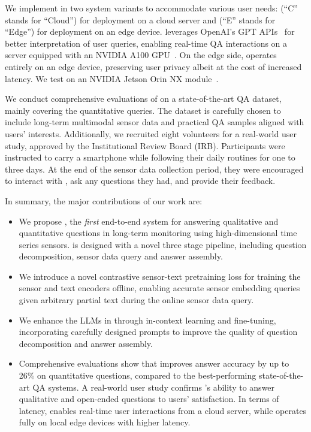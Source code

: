 We implement \Method in two system variants to accommodate various user needs: \MethodC (``C'' stands for ``Cloud'') for deployment on a cloud server and \MethodE (``E'' stands for ``Edge'') for deployment on an edge device. \MethodC leverages OpenAI’s GPT APIs~\cite{gpt-3.5,gpt-4} for better interpretation of user queries, enabling real-time QA interactions on a server equipped with an NVIDIA A100 GPU~\cite{a100}. On the edge side, \MethodE operates entirely on an edge device, preserving user privacy albeit at the cost of increased latency. We test \MethodE on an NVIDIA Jetson Orin NX module~\cite{jetsonorin}.

We conduct comprehensive evaluations of \Method on a state-of-the-art QA dataset, mainly covering the quantitative queries. The dataset is carefully chosen to include long-term multimodal sensor data and practical QA samples aligned with users' interests.
Additionally, we recruited eight volunteers for a real-world user study, approved by the Institutional Review Board (IRB). Participants were instructed to carry a smartphone while following their daily routines for one to three days. At the end of the sensor data collection period, they were encouraged to interact with \Method, ask any questions they had, and provide their feedback. %


In summary, the major contributions of our work are:
\begin{itemize}[nolistsep]
    \item We propose \Method, the \textit{first} end-to-end system for answering qualitative and quantitative questions in long-term monitoring using high-dimensional time series sensors. \Method is designed with a novel three stage pipeline, including question decomposition, sensor data query and answer assembly.
    \item We introduce a novel contrastive sensor-text pretraining loss for training the sensor and text encoders offline, enabling accurate sensor embedding queries given arbitrary partial text during the online sensor data query.
    \item We enhance the LLMs in \Method through in-context learning and fine-tuning, incorporating carefully designed prompts to improve the quality of question decomposition and answer assembly.
    \item Comprehensive evaluations show that \Method improves answer accuracy by up to 26\% on quantitative questions, compared to the best-performing state-of-the-art QA systems. A real-world user study confirms \Method’s ability to answer qualitative and open-ended questions to users' satisfaction. In terms of latency, \MethodC enables real-time user interactions from a cloud server, while \MethodE operates fully on local edge devices with higher latency.
\end{itemize}



